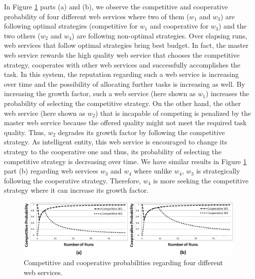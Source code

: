 \documentclass[runningheads,a4paper]{llncs}
\begin{document}
In Figure \ref{Graph2} parts (a) and (b), we observe the
competitive and cooperative probability of four different web
services where two of them ($w_1$ and $w_3$) are following optimal
strategies (competitive for $w_1$ and cooperative for $w_3$) and
the two others ($w_2$ and $w_4$) are following non-optimal
strategies. Over elapsing runs, web services that follow optimal
strategies bring best budget. In fact, the master web service
rewards the high quality web service that chooses the competitive
strategy, cooperates with other web services and successfully 
accomplishes the task. In this system, the reputation regarding
such a web service is increasing over time and the possibility of
allocating further tasks is increasing as well. By increasing the
growth factor, such a web service (here shown as $w_1$) increases
the probability of selecting the competitive strategy. On the
other hand, the other web service (here shown as $w_2$) that is
incapable of competing is penalized by the master web service
because the offered quality might not meet the required task
quality. Thus, $w_2$ degrades its growth factor by following the
competitive strategy. As intelligent entity, this web service is
encouraged to change its strategy to the cooperative one and thus,
its probability of selecting the competitive strategy is
decreasing over time. We have similar results in Figure
\ref{Graph2} part (b) regarding web services $w_3$ and $w_4$ where
unlike $w_4$, $w_3$ is strategically following the cooperative
strategy. Therefore, $w_4$ is more seeking the competitive
strategy where it can increase its growth factor.

\begin{figure}%
\centering
\includegraphics[scale=0.31]{Graph2.eps}
\caption{Competitive and cooperative probabilities regarding four
different web services.} \label{Graph2}
\end{figure}
\end{document}
